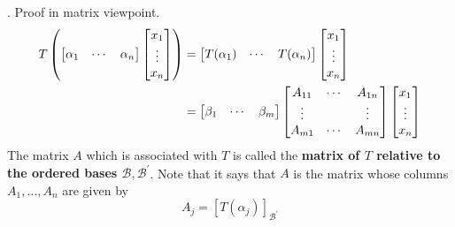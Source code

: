 \documentclass[8pt]{beamer}
\newcommand{\mc}[1]{\mathcal{#1}}
\newcommand{\tb}[1]{\textbf{#1}}
\begin{document}
\begin{frame}{.}
    Proof in matrix viewpoint.
    \[
    \begin{aligned}
        T\left( \left[\begin{matrix} \alpha_1 & \cdots & \alpha_n \end{matrix}\right] \left[\begin{matrix} x_1 \\ \vdots \\ x_n \end{matrix} \right]\right) &= \left[\begin{matrix} T(\alpha_1) & \cdots & T(\alpha_n) \end{matrix}\right] \left[\begin{matrix} x_1 \\ \vdots \\ x_n \end{matrix}\right] \\
        &= \left[\begin{matrix} \beta_1 & \cdots & \beta_m \end{matrix}\right] \left[\begin{matrix} A_{11} & \cdots & A_{1n} \\ \vdots & \empty & \vdots \\ A_{m1} & \cdots & A_{mn}\end{matrix}\right] \left[\begin{matrix} x_1 \\ \vdots \\ x_n\end{matrix}\right]
    \end{aligned}
    \]
    The matrix $A$ which is associated with $T$ is called the \tb{matrix of $T$ relative to the ordered bases $\mc{B}, \mc{B}^\prime$}.
    Note that it says that $A$ is the matrix whose columns $A_1, \dots, A_n$ are given by
    \[
        A_j = [T(\alpha_j)]_{\mc{B}^\prime}
    \]
\end{frame}
\end{document}
